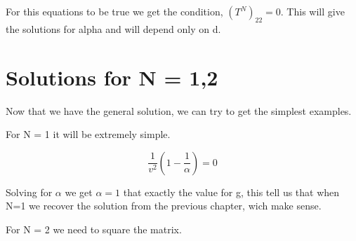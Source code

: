For this equations to be true we get the condition, $(T^N)_{22}=0$. This will give the solutions for alpha and will depend only on d. 


\section{Solutions for N = 1,2}

Now that we have the general solution, we can try to get the simplest examples.

For N = 1 it will be extremely simple.

\begin{equation}
  \label{5.11}
  \frac{1}{v^2}(1-\frac{1}{\alpha}) = 0
\end{equation}

Solving for $\alpha$ we get $\alpha=1$ that exactly the value for g, this tell us that when N=1 we recover the solution from the previous chapter, wich make sense.

For N = 2 we need to square the matrix.

